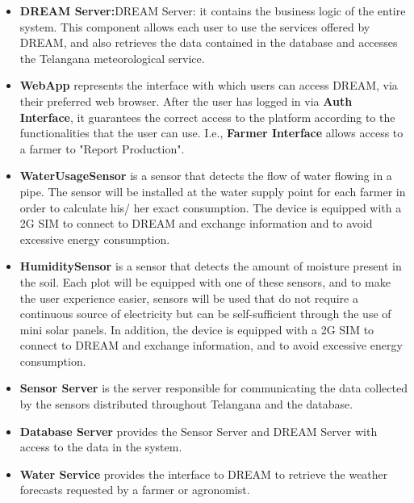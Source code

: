 \begin{itemize}
    \item \textbf{DREAM Server:}DREAM Server: it contains the business logic of the entire system. This component allows each user to use the services offered by DREAM, and also retrieves the data contained in the database and accesses the Telangana meteorological service.
    \item \textbf{WebApp} represents the interface with which users can access DREAM, via their preferred web browser. After the user has logged in via \textbf{Auth Interface}, it guarantees the correct access to the platform according to the functionalities that the user can use. I.e., \textbf{Farmer Interface} allows access to a farmer to "Report Production".
    \item \textbf{WaterUsageSensor} is a sensor that detects the flow of water flowing in a pipe. The sensor will be installed at the water supply point for each farmer in order to calculate his/ her exact consumption. The device is equipped with a 2G SIM to connect to DREAM and exchange information and to avoid excessive energy consumption.
    \item \textbf{HumiditySensor} is a sensor that detects the amount of moisture present in the soil. Each plot will be equipped with one of these sensors, and to make the user experience easier, sensors will be used that do not require a continuous source of electricity but can be self-sufficient through the use of mini solar panels. In addition, the device is equipped with a 2G SIM to connect to DREAM and exchange information, and to avoid excessive energy consumption.
    \item \textbf{Sensor Server} is the server responsible for communicating the data collected by the sensors distributed throughout Telangana and the database.
    \item \textbf{Database Server} provides the Sensor Server and DREAM Server with access to the data in the system.
    \item \textbf{Water Service} provides the interface to DREAM to retrieve the weather forecasts requested by a farmer or agronomist.
\end{itemize}
